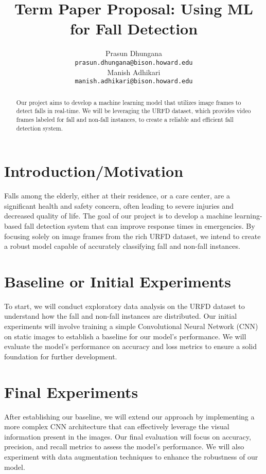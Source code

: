 \documentclass{article} %
\title{Term Paper Proposal: Using ML for Fall Detection}
\author{
Prasun Dhungana \\
\texttt{prasun.dhungana@bison.howard.edu} \\
Manish Adhikari \\
\texttt{manish.adhikari@bison.howard.edu} \\
}
\begin{document}
\maketitle

\begin{abstract}
Our project aims to develop a machine learning model that utilizes image frames to detect falls in real-time. We will be leveraging the URFD dataset, which provides video frames labeled for fall and non-fall instances, to create a reliable and efficient fall detection system.
\end{abstract}

\section{Introduction/Motivation}
Falls among the elderly, either at their residence, or a care center, are a significant health and safety concern, often leading to severe injuries and decreased quality of life. The goal of our project is to develop a machine learning-based fall detection system that can improve response times in emergencies. By focusing solely on image frames from the rich URFD dataset, we intend to create a robust model capable of accurately classifying fall and non-fall instances.

\section{Baseline or Initial Experiments}
To start, we will conduct exploratory data analysis on the URFD dataset to understand how the fall and non-fall instances are distributed. Our initial experiments will involve training a simple Convolutional Neural Network (CNN) on static images to establish a baseline for our model's performance. We will evaluate the model's performance on accuracy and loss metrics to ensure a solid foundation for further development.

\section{Final Experiments}
After establishing our baseline, we will extend our approach by implementing a more complex CNN architecture that can effectively leverage the visual information present in the images. Our final evaluation will focus on accuracy, precision, and recall metrics to assess the model’s performance. We will also experiment with data augmentation techniques to enhance the robustness of our model.
\end{document}
